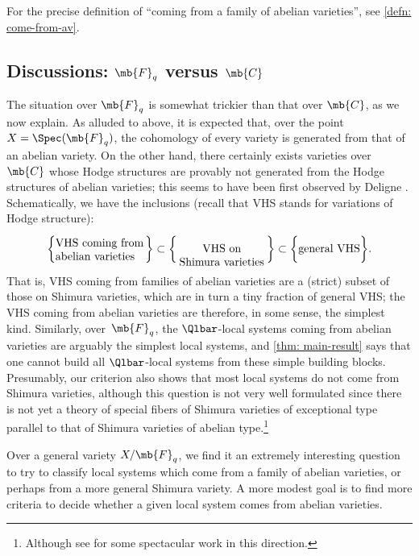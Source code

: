 For the precise definition of \enquote{coming from a family of abelian varieties}, see \cref{defn: come-from-av}.

\subsection{Discussions: \texorpdfstring{$\mb{F}_q$}{Fq} versus \texorpdfstring{$\mb{C}$}{C}}
The situation over $\mb{F}_q$ is somewhat trickier than that over $\mb{C}$, as we now explain. As alluded to above, it is expected that, over the point $X=\Spec(\mb{F}_q)$, the cohomology of every variety is generated from that of an abelian variety. On the other hand, there certainly exists varieties over $\mb{C}$ whose Hodge structures are provably not generated from the Hodge structures of abelian varieties; this seems to have been first observed by Deligne \cite[\S 7.6]{Deligne-La-conjecture-de-Weil-pour-les-surfaces-K3}.
Schematically, we have the inclusions (recall that VHS stands for variations of Hodge structure):
\[
\bigg\{
\parbox{8em}{VHS coming from\\abelian varieties}
\bigg\} \subset
\bigg\{\parbox{8em}{\center VHS on \\Shimura varieties}
\bigg\} \subset
\bigg\{
\parbox{5.5em}{general VHS}
\bigg\}.
\]
That is, VHS coming from families of abelian varieties are a (strict) subset of those on Shimura varieties, which are in turn a tiny fraction of general VHS; the VHS coming from abelian varieties are therefore, in some sense, the simplest kind. Similarly, over~$\mb{F}_q$, the $\Qlbar$-local systems coming from abelian varieties are arguably the simplest local systems, and \cref{thm: main-result} says that one cannot build all $\Qlbar$-local systems from these simple building blocks. Presumably, our criterion also shows that most local systems do not come from Shimura varieties, although this question is not very well formulated since there is not yet a theory of special fibers of Shimura varieties of exceptional type parallel to that of Shimura varieties of abelian type.\footnote{Although see \cite{Bakker-Shankar-Tsimerman-Integral-Canonical-Models-of-Exceptional-Shimura-Varieties} for some spectacular work in this direction.}

Over a general variety $X/\mb{F}_q$, we find it an extremely interesting question to try to classify local systems which come from a family of abelian varieties, or perhaps from a more general Shimura variety. A more modest goal is to find more criteria to decide whether a given local system comes from abelian varieties.

